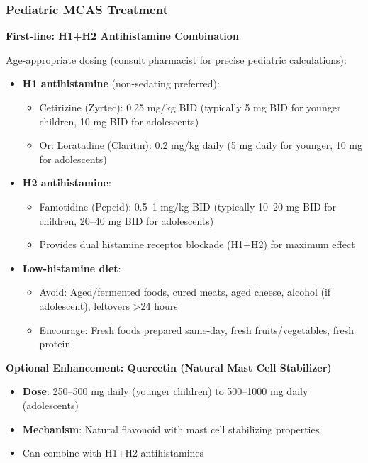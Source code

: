 \subsubsection{Pediatric MCAS Treatment}

\begin{protocol}

\textbf{First-line: H1+H2 Antihistamine Combination}

Age-appropriate dosing (consult pharmacist for precise pediatric calculations):

\begin{itemize}
    \item \textbf{H1 antihistamine} (non-sedating preferred):
    \begin{itemize}
        \item Cetirizine (Zyrtec): 0.25 mg/kg BID (typically 5 mg BID for younger children, 10 mg BID for adolescents)
        \item Or: Loratadine (Claritin): 0.2 mg/kg daily (5 mg daily for younger, 10 mg for adolescents)
    \end{itemize}

    \item \textbf{H2 antihistamine}:
    \begin{itemize}
        \item Famotidine (Pepcid): 0.5--1 mg/kg BID (typically 10--20 mg BID for children, 20--40 mg BID for adolescents)
        \item Provides dual histamine receptor blockade (H1+H2) for maximum effect
    \end{itemize}

    \item \textbf{Low-histamine diet}:
    \begin{itemize}
        \item Avoid: Aged/fermented foods, cured meats, aged cheese, alcohol (if adolescent), leftovers >24 hours
        \item Encourage: Fresh foods prepared same-day, fresh fruits/vegetables, fresh protein
    \end{itemize}
\end{itemize}

\textbf{Optional Enhancement: Quercetin (Natural Mast Cell Stabilizer)}
\begin{itemize}
    \item \textbf{Dose}: 250--500 mg daily (younger children) to 500--1000 mg daily (adolescents)
    \item \textbf{Mechanism}: Natural flavonoid with mast cell stabilizing properties
    \item Can combine with H1+H2 antihistamines
\end{itemize}

\end{protocol}

